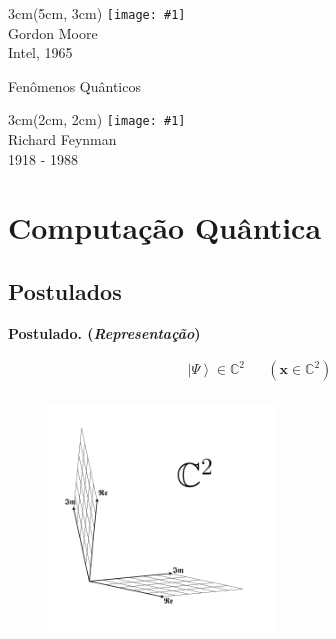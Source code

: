 \documentclass{beamer}
\newcommand{\postulado}[1]{%
	\textbf{Postulado. (\emph{#1})\\}
}
\newcommand{\ket}[1]{\ensuremath{\left|#1\right\rangle}}
\newcommand{\braket}[2]{\ensuremath{\left\langle#1|#2\right\rangle}}
\newcommand{\comicfinal}[1]{
	\bgroup
	\usebackgroundtemplate{\texttt{[image: \#1]}}
	\begin{frame}[plain]{}

	\end{frame}
	\egroup
}
\newcommand{\person}[6]{%
\begin{textblock*}{#4}(#5, #6)
	\texttt{[image: \#1]}\\
	#2\\
	{\small #3}
\end{textblock*}
}
\begin{document}
	\comicfinal{moores-law.pdf}
	
	\begin{frame}
		\person{moore.jpg}{Gordon Moore}{Intel, 1965}{3cm}{5cm}{3cm}
	\end{frame}

	\begin{frame}{Fenômenos Quânticos}
		\person{feynman.jpg}{Richard Feynman}{1918 - 1988}{3cm}{2cm}{2cm}
			
	\end{frame}
		
	
	\section{Computação Quântica}
	
	\subsection{Postulados}
	
	\begin{frame}{\subsecname}
		\postulado{Representação}
		\begin{align*}
			\ket{\Psi} \in \mathbb{C}^2 && (\mathbf{x} \in \mathbb{C}^2)\\
		\end{align*}
		\vspace{-1cm} 
		\begin{figure}[H]
			\includegraphics[width=6cm]{c2.pdf}
		\end{figure}
	\end{frame}
	
\end{document}
